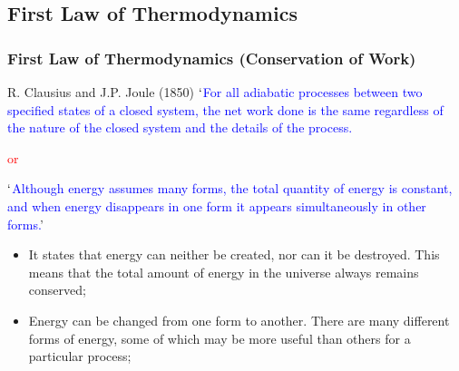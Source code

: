\documentclass[10pt,compress]{beamer}
\begin{document}
\begin{frame}
\end{frame}


\subsection{First Law of Thermodynamics}

\begin{frame}
 \frametitle{First Law of Thermodynamics (Conservation of Work)}

 \begin{block}{R. Clausius and J.P. Joule (1850)}
  \textcolor{blue}{$\lq$For all adiabatic processes between two specified states of a closed system, the net work done is the same regardless of the nature of the closed system and the details of the process.}
  \begin{center}
   \textcolor{red}{or}
  \end{center}
  \textcolor{blue}{$\lq$Although energy assumes many forms, the total quantity of energy is constant, and when energy disappears in one form it appears simultaneously in other forms.}'
 \end{block}


 \begin{itemize}
  \item<2-> It states that energy can neither be created, nor can it be destroyed. This means that the total amount of energy in the universe always remains conserved;
  \item<3-> Energy can be changed from one form to another. There are many different forms of energy, some of which may be more useful than others for a particular process;
 \end{itemize}

\normalsize
\end{frame}
\end{document}
